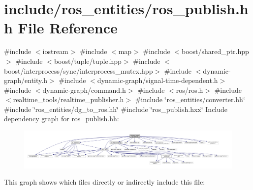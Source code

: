 \hypertarget{ros__publish_8hh}{}\section{include/ros\+\_\+entities/ros\+\_\+publish.hh File Reference}
\label{ros__publish_8hh}
{\ttfamily \#include $<$iostream$>$}\newline
{\ttfamily \#include $<$map$>$}\newline
{\ttfamily \#include $<$boost/shared\+\_\+ptr.\+hpp$>$}\newline
{\ttfamily \#include $<$boost/tuple/tuple.\+hpp$>$}\newline
{\ttfamily \#include $<$boost/interprocess/sync/interprocess\+\_\+mutex.\+hpp$>$}\newline
{\ttfamily \#include $<$dynamic-\/graph/entity.\+h$>$}\newline
{\ttfamily \#include $<$dynamic-\/graph/signal-\/time-\/dependent.\+h$>$}\newline
{\ttfamily \#include $<$dynamic-\/graph/command.\+h$>$}\newline
{\ttfamily \#include $<$ros/ros.\+h$>$}\newline
{\ttfamily \#include $<$realtime\+\_\+tools/realtime\+\_\+publisher.\+h$>$}\newline
{\ttfamily \#include \char`\"{}ros\+\_\+entities/converter.\+hh\char`\"{}}\newline
{\ttfamily \#include \char`\"{}ros\+\_\+entities/dg\+\_\+to\+\_\+ros.\+hh\char`\"{}}\newline
{\ttfamily \#include \char`\"{}ros\+\_\+publish.\+hxx\char`\"{}}\newline
Include dependency graph for ros\+\_\+publish.\+hh\+:
\nopagebreak
\begin{figure}[H]
\begin{center}
\leavevmode
\includegraphics[width=350pt]{ros__publish_8hh__incl}
\end{center}
\end{figure}
This graph shows which files directly or indirectly include this file\+:
\nopagebreak
